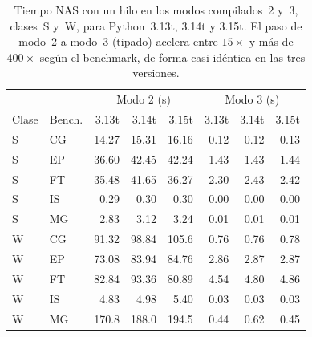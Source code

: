 \begin{table}[htbp]
\centering
\footnotesize
\renewcommand{\arraystretch}{0.95}
\begin{tabular}{llrrrrrr}
\hline
 & & \multicolumn{3}{c}{Modo 2 (s)} & \multicolumn{3}{c}{Modo 3 (s)} \\
Clase & Bench. & 3.13t & 3.14t & 3.15t & 3.13t & 3.14t & 3.15t \\
\hline
S & CG & 14.27 & 15.31 & 16.16 & 0.12 & 0.12 & 0.13 \\
S & EP & 36.60 & 42.45 & 42.24 & 1.43 & 1.43 & 1.44 \\
S & FT & 35.48 & 41.65 & 36.27 & 2.30 & 2.43 & 2.42 \\
S & IS & 0.29 & 0.30 & 0.30 & 0.00 & 0.00 & 0.00 \\
S & MG & 2.83 & 3.12 & 3.24 & 0.01 & 0.01 & 0.01 \\
W & CG & 91.32 & 98.84 & 105.6 & 0.76 & 0.76 & 0.78 \\
W & EP & 73.08 & 83.94 & 84.76 & 2.86 & 2.87 & 2.87 \\
W & FT & 82.84 & 93.36 & 80.89 & 4.54 & 4.80 & 4.86 \\
W & IS & 4.83 & 4.98 & 5.40 & 0.03 & 0.03 & 0.03 \\
W & MG & 170.8 & 188.0 & 194.5 & 0.44 & 0.62 & 0.45 \\
\hline
\end{tabular}
\caption{Tiempo NAS con un hilo en los modos compilados~2 y~3, clases~S y~W,
para Python~3.13t, 3.14t y 3.15t. El paso de modo~2 a modo~3 (tipado) acelera
entre $15\times$ y más de $400\times$ según el benchmark, de forma casi idéntica
en las tres versiones.}
\label{tab:versiones-tipado-t1}
\end{table}
